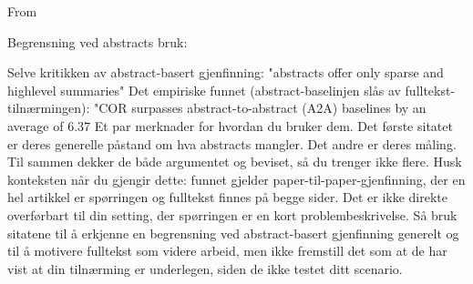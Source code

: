From \parencite{park2026chain_of_retrieval}

Begrensning ved abstracts bruk:

Selve kritikken av abstract-basert gjenfinning:
"abstracts offer only sparse and highlevel summaries"
Det empiriske funnet (abstract-baselinjen slås av fulltekst-tilnærmingen):
"COR surpasses abstract-to-abstract (A2A) baselines by an average of 6.37%
Et par merknader for hvordan du bruker dem.
Det første sitatet er deres generelle påstand om hva abstracts mangler. Det andre er deres måling. Til sammen dekker de både argumentet og beviset, så du trenger ikke flere.
Husk konteksten når du gjengir dette: funnet gjelder paper-til-paper-gjenfinning, der en hel artikkel er spørringen og fulltekst finnes på begge sider. Det er ikke direkte overførbart til din setting, der spørringen er en kort problembeskrivelse. Så bruk sitatene til å erkjenne en begrensning ved abstract-basert gjenfinning generelt og til å motivere fulltekst som videre arbeid, men ikke fremstill det som at de har vist at din tilnærming er underlegen, siden de ikke testet ditt scenario.

